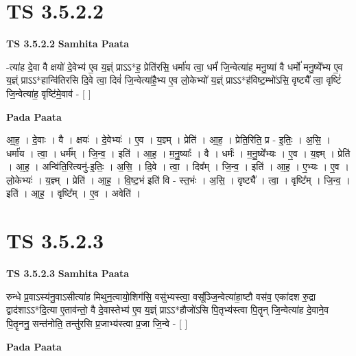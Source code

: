 \documentclass[17pt]{extarticle}
\begin{document}

\section{ TS 3.5.2.2 }

\textbf{TS 3.5.2.2 } \newline
\textbf{Samhita Paata} \newline

-त्या॑ह दे॒वा वै क्षयो॑ दे॒वेभ्य॑ ए॒व य॒ज्ञ्ं प्राऽऽ*ह॒ प्रेति॑रसि॒ धर्मा॑य त्वा॒ धर्मं॑ जि॒न्वेत्या॑ह मनु॒ष्या॑ वै धर्मो॑ मनु॒ष्ये᳚भ्य ए॒व य॒ज्ञ्ं प्राऽऽ*हान्वि॑तिरसि दि॒वे त्वा॒ दिवं॑ जि॒न्वेत्या॑है॒भ्य ए॒व लो॒केभ्यो॑ य॒ज्ञ्ं प्राऽऽ*ह॑विष्ट॒म्भो॑ऽसि॒ वृष्ट्यै᳚ त्वा॒ वृष्टिं॑ जि॒न्वेत्या॑ह॒ वृष्टि॑मे॒वाव॑ - [  ] \newline

\textbf{Pada Paata} \newline

आ॒ह॒ । दे॒वाः । वै । क्षयः॑ । दे॒वेभ्यः॑ । ए॒व । य॒ज्ञ्म् । प्रेति॑ । आ॒ह॒ । प्रेति॒रिति॒ प्र - इ॒तिः॒ । अ॒सि॒ । धर्मा॑य । त्वा॒ । धर्म᳚म् । जि॒न्व॒ । इति॑ । आ॒ह॒ । म॒नु॒ष्याः᳚ । वै । धर्मः॑ । म॒नु॒ष्ये᳚भ्यः । ए॒व । य॒ज्ञ्म् । प्रेति॑ । आ॒ह॒ । अन्वि॑ति॒रित्यनु॑-इ॒तिः॒ । अ॒सि॒ । दि॒वे । त्वा॒ । दिव᳚म् । जि॒न्व॒ । इति॑ । आ॒ह॒ । ए॒भ्यः । ए॒व । लो॒केभ्यः॑ । य॒ज्ञ्म् । प्रेति॑ । आ॒ह॒ । वि॒ष्ट॒भं इति॑ वि - स्त॒भंः । अ॒सि॒ । वृष्ट्यै᳚ । त्वा॒ । वृष्टि᳚म् । जि॒न्व॒ । इति॑ । आ॒ह॒ । वृष्टि᳚म् । ए॒व । अवेति॑ ।  \newline





\section{ TS 3.5.2.3 }

\textbf{TS 3.5.2.3 } \newline
\textbf{Samhita Paata} \newline

रुन्धे प्र॒वाऽस्य॑नु॒वाऽसीत्या॑ह मिथुन॒त्वायो॒शिग॑सि॒ वसु॑भ्यस्त्वा॒ वसू᳚ञ्जि॒न्वेत्या॑हा॒ष्टौ वस॑व॒ एका॑दश रु॒द्रा द्वाद॑शाऽऽ*दि॒त्या ए॒ताव॑न्तो॒ वै दे॒वास्तेभ्य॑ ए॒व य॒ज्ञ्ं प्राऽऽ*हौजो॑ऽसि पि॒तृभ्य॑स्त्वा पि॒तॄन् जि॒न्वेत्या॑ह दे॒वाने॒व पि॒तॄननु॒ सन्त॑नोति॒ तन्तु॑रसि प्र॒जाभ्य॑स्त्वा प्र॒जा जि॒न्वे - [  ] \newline

\textbf{Pada Paata} \newline
\end{document}
